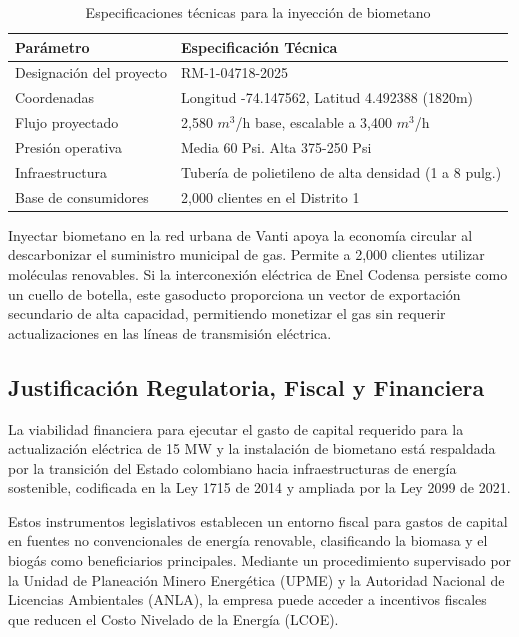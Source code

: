 \documentclass[11pt,letterpaper]{article}
\begin{document}
\begin{table}[htbp]
  \centering
  \caption{Especificaciones técnicas para la inyección de biometano}
  \label{tab:biometano}
  \begin{tabular}{p{} p{}}
    \toprule
    Parámetro & Especificación Técnica \\
    \midrule
    Designación del proyecto & RM-1-04718-2025 \\
    Coordenadas & Longitud -74.147562, Latitud 4.492388 (1820m) \\
    Flujo proyectado & 2,580 $m^3$/h base, escalable a 3,400 $m^3$/h \\
    Presión operativa & Media 60 Psi. Alta 375-250 Psi \\
    Infraestructura & Tubería de polietileno de alta densidad (1 a 8 pulg.) \\
    Base de consumidores & 2,000 clientes en el Distrito 1 \\
    \bottomrule
  \end{tabular}
\end{table}

Inyectar biometano en la red urbana de Vanti apoya la economía circular al
descarbonizar el suministro municipal de gas. Permite a 2,000 clientes utilizar
moléculas renovables. Si la interconexión eléctrica de Enel Codensa persiste
como un cuello de botella, este gasoducto proporciona un vector de exportación
secundario de alta capacidad, permitiendo monetizar el gas sin requerir
actualizaciones en las líneas de transmisión eléctrica.

\subsection{Justificación Regulatoria, Fiscal y Financiera}

La viabilidad financiera para ejecutar el gasto de capital requerido para la
actualización eléctrica de 15 MW y la instalación de biometano está respaldada
por la transición del Estado colombiano hacia infraestructuras de energía
sostenible, codificada en la Ley 1715 de 2014 y ampliada por la Ley 2099 de
2021.

Estos instrumentos legislativos establecen un entorno fiscal para gastos de
capital en fuentes no convencionales de energía renovable, clasificando la
biomasa y el biogás como beneficiarios principales. Mediante un procedimiento
supervisado por la Unidad de Planeación Minero Energética (UPME) y la Autoridad
Nacional de Licencias Ambientales (ANLA), la empresa puede acceder a incentivos
fiscales que reducen el Costo Nivelado de la Energía (LCOE).
\end{document}
